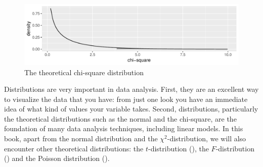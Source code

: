 \documentclass[]{report}\usepackage[]{graphicx}\usepackage[]{color}
\makeatletter
\def\maxwidth{ %
  \ifdim\Gin@nat@width>\linewidth
    \linewidth
  \else
    \Gin@nat@width
  \fi
}
\newenvironment{kframe}{%
 \def\at@end@of@kframe{}%
 \ifinner\ifhmode%
  \def\at@end@of@kframe{\end{minipage}}%
  \begin{minipage}{\columnwidth}%
 \fi\fi%
 \def\FrameCommand##1{\hskip\@totalleftmargin \hskip-\fboxsep
 \colorbox{shadecolor}{##1}\hskip-\fboxsep
     \hskip-\linewidth \hskip-\@totalleftmargin \hskip\columnwidth}%
 \MakeFramed {\advance\hsize-\width
   \@totalleftmargin\z@ \linewidth\hsize
   \@setminipage}}%
 {\par\unskip\endMakeFramed%
 \at@end@of@kframe}
\newenvironment{knitrout}{}{} %
\makeatother
\begin{document}


\begin{knitrout}
\color{fgcolor}\begin{figure}

{\centering \includegraphics[width=\maxwidth]{figure/distr_6-1} 

}

\caption[The theoretical chi-square distribution]{The theoretical chi-square distribution}\label{fig:distr_6}
\end{figure}

\begin{kframe}

{\ttfamily\noindent\bfseries\color{errorcolor}{\#\# Error: Cannot add ggproto objects together. Did you forget to add this object to a ggplot object?}}\end{kframe}
\end{knitrout}
% 
% 
Distributions are very important in data analysis. First, they are an excellent way to visualize the data that you have: from just one look you have an immediate idea of what kind of values your variable takes. Second, distributions, particularly the theoretical distributions such as the normal and the chi-square, are the foundation of many data analysis techniques, including linear models. In this book, apart from the normal distribution and the $\chi^2$-distribution, we will also encounter other theoretical distributions: the $t$-distribution (), the $F$-distribution () and the Poisson distribution ().



% 
% 
\end{document}

